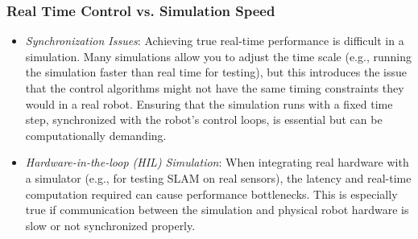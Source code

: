 \documentclass[../../main]{subfiles}
\begin{document}
    \subsubsection{Real Time Control vs. Simulation Speed}
    \begin{itemize}
    \item
      \emph{Synchronization Issues}: Achieving true real-time performance
      is difficult in a simulation. Many simulations allow you to adjust the
      time scale (e.g., running the simulation faster than real time for
      testing), but this introduces the issue that the control algorithms
      might not have the same timing constraints they would in a real robot.
      Ensuring that the simulation runs with a fixed time step, synchronized
      with the robot's control loops, is essential but can be
      computationally demanding.
    \item
      \emph{Hardware-in-the-loop (HIL) Simulation}: When integrating real
      hardware with a simulator (e.g., for testing SLAM on real sensors),
      the latency and real-time computation required can cause performance
      bottlenecks. This is especially true if communication between the
      simulation and physical robot hardware is slow or not synchronized
      properly.
    \end{itemize}
\end{document}
